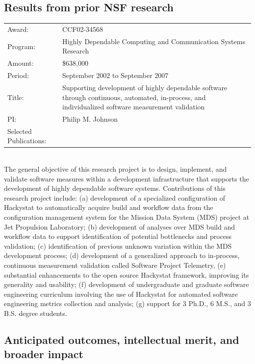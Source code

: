 \subsection{Results from prior NSF research}

\begin{tabular}{p{1in}p{5in}}

Award: & CCF02-34568 \\ 
Program: & Highly Dependable Computing and Communication Systems Research\\ 
Amount: & \$638,000 \\ 
Period: & September 2002 to September 2007 \\ 
Title: & Supporting development of highly dependable software through
continuous, automated, in-process, and individualized software measurement validation \\ 
PI: & Philip M. Johnson \\ 
Selected \newline Publications: & \cite{csdl2-04-22,csdl2-04-13,csdl2-04-11,csdl2-03-12,
csdl2-02-07,csdl2-03-07,csdl2-04-02,csdl2-04-04,csdl2-04-11,csdl2-06-07,csdl2-06-08,csdl2-06-13,csdl2-06-06}
\end{tabular} \\ %

The general objective of this  research project is to design,
implement, and validate software measures within a development
infrastructure that supports the development of highly dependable software
systems.  Contributions of this research project include: (a) development
of a specialized configuration of Hackystat to automatically acquire build
and workflow data from the configuration management system for the Mission
Data System (MDS) project at Jet Propulsion Laboratory; (b) development of
analyses over MDS build and workflow data to support identification of
potential bottlenecks and process validation; (c) identification of
previous unknown variation within the MDS development process; (d)
development of a generalized approach to in-process, continuous measurement
validation called Software Project Telemetry, (e) substantial enhancements
to the open source Hackystat framework, improving its generality and
usability; (f) development of undergraduate and graduate software
engineering curriculum involving the use of Hackystat for automated
software engineering metrics collection and analysis; (g) support for 3
Ph.D., 6 M.S., and 3 B.S. degree students.


\subsection{Anticipated outcomes, intellectual merit, and broader impact}
\label{sec:anticipated-outcomes}

